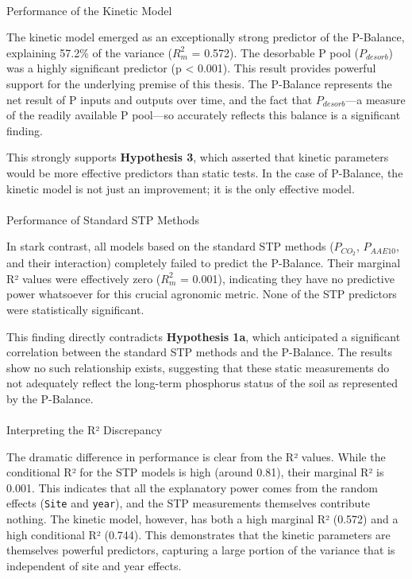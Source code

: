 \documentclass[
  a4paper,
]{article}
\makeatletter
\let\oldparagraph\paragraph
\renewcommand{\paragraph}{
    \@ifstar
      \xxxParagraphStar
      \xxxParagraphNoStar
  }
\newcommand{\xxxParagraphStar}[1]{\oldparagraph*{#1}\mbox{}}
\newcommand{\xxxParagraphNoStar}[1]{\oldparagraph{#1}\mbox{}}
\makeatother
\begin{document}
\paragraph{Performance of the Kinetic
Model}\label{performance-of-the-kinetic-model-2}

The kinetic model emerged as an exceptionally strong predictor of the
P-Balance, explaining 57.2\% of the variance (\(R^2_m\) = 0.572). The
desorbable P pool (\(P_{desorb}\)) was a highly significant predictor (p
\textless{} 0.001). This result provides powerful support for the
underlying premise of this thesis. The P-Balance represents the net
result of P inputs and outputs over time, and the fact that
\(P_{desorb}\)---a measure of the readily available P pool---so
accurately reflects this balance is a significant finding.

This strongly supports \textbf{Hypothesis 3}, which asserted that
kinetic parameters would be more effective predictors than static tests.
In the case of P-Balance, the kinetic model is not just an improvement;
it is the only effective model.

\paragraph{Performance of Standard STP
Methods}\label{performance-of-standard-stp-methods-2}

In stark contrast, all models based on the standard STP methods
(\(P_{CO_2}\), \(P_{AAE10}\), and their interaction) completely failed
to predict the P-Balance. Their marginal R² values were effectively zero
(\(R^2_m\) = 0.001), indicating they have no predictive power whatsoever
for this crucial agronomic metric. None of the STP predictors were
statistically significant.

This finding directly contradicts \textbf{Hypothesis 1a}, which
anticipated a significant correlation between the standard STP methods
and the P-Balance. The results show no such relationship exists,
suggesting that these static measurements do not adequately reflect the
long-term phosphorus status of the soil as represented by the P-Balance.

\paragraph{Interpreting the R²
Discrepancy}\label{interpreting-the-ruxb2-discrepancy}

The dramatic difference in performance is clear from the R² values.
While the conditional R² for the STP models is high (around 0.81), their
marginal R² is 0.001. This indicates that all the explanatory power
comes from the random effects (\texttt{Site} and \texttt{year}), and the
STP measurements themselves contribute nothing. The kinetic model,
however, has both a high marginal R² (0.572) and a high conditional R²
(0.744). This demonstrates that the kinetic parameters are themselves
powerful predictors, capturing a large portion of the variance that is
independent of site and year effects.
\end{document}
